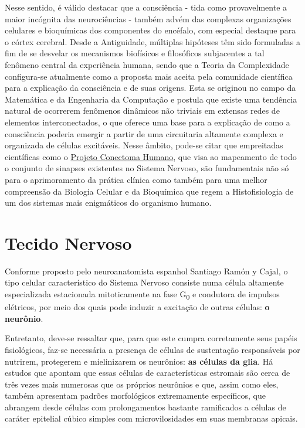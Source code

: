 \documentclass[
]{book}
\theoremstyle{definition}
\theoremstyle{definition}
\theoremstyle{definition}
\theoremstyle{definition}
\theoremstyle{remark}
\begin{document}
Nesse sentido, é válido destacar que a consciência - tida como provavelmente a maior incógnita das neurociências - também advém das complexas organizações celulares e bioquímicas dos componentes do encéfalo, com especial destaque para o córtex cerebral. Desde a Antiguidade, múltiplas hipóteses têm sido formuladas a fim de se desvelar os mecanismos biofísicos e filosóficos subjacentes a tal fenômeno central da experiência humana, sendo que a Teoria da Complexidade configura-se atualmente como a proposta mais aceita pela comunidade científica para a explicação da consciência e de suas origens. Esta se originou no campo da Matemática e da Engenharia da Computação e postula que existe uma tendência natural de ocorrerem fenômenos dinâmicos não triviais em extensas redes de elementos interconectados, o que oferece uma base para a explicação de como a consciência poderia emergir a partir de uma circuitaria altamente complexa e organizada de células excitáveis. Nesse âmbito, pode-se citar que empreitadas científicas como o \href{https://www.humanconnectome.org/}{Projeto Conectoma Humano}, que visa ao mapeamento de todo o conjunto de sinapses existentes no Sistema Nervoso, são fundamentais não só para o aprimoramento da prática clínica como também para uma melhor compreensão da Biologia Celular e da Bioquímica que regem a Histofisiologia de um dos sistemas mais enigmáticos do organismo humano.

\hypertarget{tecido-nervoso}{%
\section{Tecido Nervoso}\label{tecido-nervoso}}

Conforme proposto pelo neuroanatomista espanhol Santiago Ramón y Cajal, o tipo celular característico do Sistema Nervoso consiste numa célula altamente especializada estacionada mitoticamente na fase G\textsubscript{0} e condutora de impulsos elétricos, por meio dos quais pode induzir a excitação de outras células: \textbf{o neurônio}.

Entretanto, deve-se ressaltar que, para que este cumpra corretamente seus papéis fisiológicos, faz-se necessária a presença de células de sustentação responsáveis por nutrirem, protegerem e mielinizarem os neurônios: \textbf{as células da glia}. Há estudos que apontam que essas células de características estromais são cerca de três vezes mais numerosas que os próprios neurônios e que, assim como eles, também apresentam padrões morfológicos extremamente específicos, que abrangem desde células com prolongamentos bastante ramificados a células de caráter epitelial cúbico simples com microvilosidades em suas membranas apicais.
\end{document}
